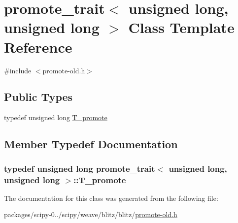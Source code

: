 \hypertarget{classpromote__trait_3_01unsigned_01long_00_01unsigned_01long_01_4}{}\section{promote\+\_\+trait$<$ unsigned long, unsigned long $>$ Class Template Reference}
\label{classpromote__trait_3_01unsigned_01long_00_01unsigned_01long_01_4}


{\ttfamily \#include $<$promote-\/old.\+h$>$}

\subsection*{Public Types}
\begin{DoxyCompactItemize}
\item 
typedef unsigned long \hyperlink{classpromote__trait_3_01unsigned_01long_00_01unsigned_01long_01_4_ad3c0b37f86092cdf8e4085ad45cc5734}{T\+\_\+promote}
\end{DoxyCompactItemize}


\subsection{Member Typedef Documentation}
\hypertarget{classpromote__trait_3_01unsigned_01long_00_01unsigned_01long_01_4_ad3c0b37f86092cdf8e4085ad45cc5734}{}
\subsubsection[{T\+\_\+promote}]{\setlength{\rightskip}{0pt plus 5cm}typedef unsigned long {\bf promote\+\_\+trait}$<$ unsigned long, unsigned long $>$\+::{\bf T\+\_\+promote}}\label{classpromote__trait_3_01unsigned_01long_00_01unsigned_01long_01_4_ad3c0b37f86092cdf8e4085ad45cc5734}


The documentation for this class was generated from the following file\+:\begin{DoxyCompactItemize}
\item 
packages/scipy-\/0../scipy/weave/blitz/blitz/\hyperlink{promote-old_8h}{promote-\/old.\+h}\end{DoxyCompactItemize}
